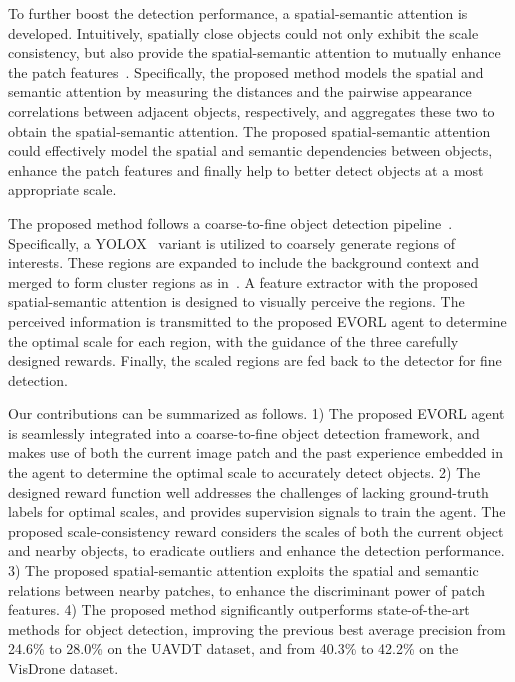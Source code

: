 \documentclass[letterpaper]{article} %
\begin{document}
To further boost the detection performance, a spatial-semantic attention is developed. Intuitively, spatially close objects could not only exhibit the scale consistency, but also provide the spatial-semantic attention to mutually enhance the patch features~\cite{he2023hierarchical,Zhang_2023_Spatial}. %
Specifically, the proposed method models the spatial and semantic attention by measuring the distances and the pairwise appearance correlations between adjacent objects, respectively, and aggregates these two to obtain the spatial-semantic attention. The proposed spatial-semantic attention could effectively model the spatial and semantic dependencies between objects, enhance the patch features and finally help to better detect objects at a most appropriate scale.


The proposed method follows a coarse-to-fine object detection pipeline~\cite{Bouguettaya_2022_review}. Specifically, a YOLOX~\cite{Ge_2021_YOLOX} variant is utilized to coarsely generate regions of interests. These regions are expanded to include the background context and merged to form cluster regions as in~\cite{Huang_2022_UFPMP}. A feature extractor with the proposed spatial-semantic attention is designed to visually perceive the regions. The perceived information is transmitted to the proposed EVORL agent to determine the optimal scale for each region, with the guidance of the three carefully designed rewards. Finally, the scaled regions are fed back to the detector for fine detection.


Our contributions can be summarized as follows. 1) The proposed EVORL agent is seamlessly integrated into a coarse-to-fine object detection framework, and makes use of both the current image patch and the past experience embedded in the agent to determine the optimal scale to accurately detect objects. 2) The designed reward function well addresses the challenges of lacking ground-truth labels for optimal scales, and provides supervision signals to train the agent. The proposed scale-consistency reward considers the scales of both the current object and nearby objects, to eradicate outliers and enhance the detection performance. 3) The proposed spatial-semantic attention exploits the spatial and semantic relations between nearby patches, to enhance the discriminant power of patch features. 4) The proposed method significantly outperforms state-of-the-art methods for object detection, improving the previous best average precision from 24.6\% to 28.0\% on the UAVDT dataset, and from 40.3\% to 42.2\% on the VisDrone dataset.
\end{document}
